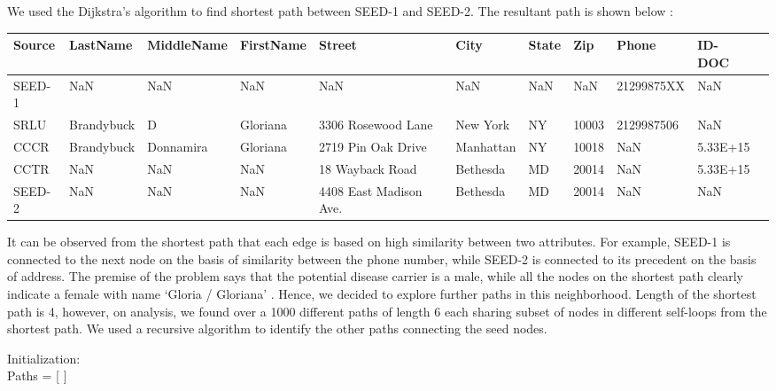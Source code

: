 \documentclass{article} %
\begin{document}
We used the Dijkstra's algorithm to find shortest path between SEED-1 and SEED-2. The resultant path is shown below : 

\begin{table}[h]
\centering
\tiny
\begin{tabular}{|l|l|l|l|l|l|l|l|l|l|l|}
\hline
\textbf{Source}  & \textbf{LastName} & \textbf{MiddleName} & \textbf{FirstName} & \textbf{Street} & \textbf{City} & \textbf{State} & \textbf{Zip} & \textbf{Phone} & \textbf{ID-DOC} \\ \hline


  SEED-1  &     NaN &       NaN &      NaN &   NaN & NaN &  NaN & NaN &   21299875XX &    NaN \\ \hline
  SRLU  & Brandybuck &  D & Gloriana & 3306 Rosewood Lane & New York &   NY &10003&2129987506&    NaN \\ \hline
  CCCR  & Brandybuck & Donnamira &  Gloriana & 2719 Pin Oak Drive & Manhattan &   NY &10018&  NaN &5.33E+15\\ \hline
  CCTR  &     NaN &       NaN &  NaN &  18 Wayback Road & Bethesda &   MD &20014&  NaN &5.33E+15\\ \hline
  SEED-2  &     NaN &       NaN &      NaN & 4408 East Madison Ave.  &Bethesda&   MD &20014&  NaN &    NaN \\ \hline
\end{tabular}
\end{table}

It can be observed from the shortest path that each edge is based on high similarity between two attributes. For example, SEED-1 is connected to the next node on the basis of similarity between the phone number, while SEED-2 is connected to its precedent on the basis of address. The premise of the problem says that the potential disease carrier is a male, while all the nodes on the shortest path clearly indicate a female with name `Gloria / Gloriana' . Hence, we decided to explore further paths in this neighborhood. Length of the shortest path is 4, however, on analysis, we found over a 1000 different paths of length 6 each sharing subset of nodes in different self-loops from the shortest path. We used a recursive algorithm to identify the other paths connecting the seed nodes.
\newline
\newline
{
\begin{algorithm}[H]
 Initialization: \\
 Paths = [ ]    \\
\end{algorithm}
}
\end{document}

